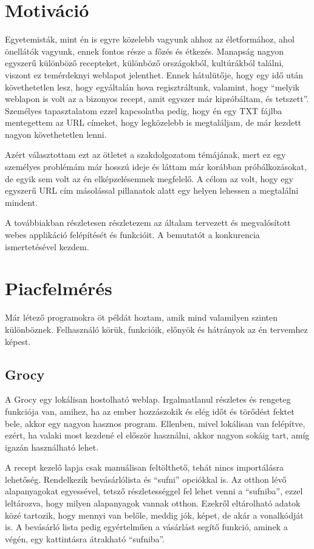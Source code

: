 \documentclass[12pt]{report}
\theoremstyle{definition}
\begin{document}
\chapter*{Motiváció}

Egyetemisták, mint én is egyre közelebb vagyunk ahhoz az életformához, ahol önellátók vagyunk, ennek fontos része a főzés és étkezés. Manapság nagyon egyszerű különböző recepteket, különböző országokból, kultúrákból találni, viszont ez temérdeknyi weblapot jelenthet. Ennek hátulütője, hogy egy idő után követhetetlen lesz, hogy egyáltalán hova regisztráltunk, valamint, hogy “melyik weblapon is volt az a bizonyos recept, amit egyszer már kipróbáltam, és tetszett”. Személyes tapasztalatom ezzel kapcsolatba pedig, hogy én egy TXT fájlba mentegettem az URL címeket, hogy legközelebb is megtaláljam, de már kezdett nagyon követhetetlen lenni.

Azért választottam ezt az ötletet a szakdolgozatom témájának, mert ez egy személyes problémám már hosszú ideje és láttam már korábban próbálkozásokat, de egyik sem volt az én elképzelésemnek megfelelő. A célom az volt, hogy egy egyszerű URL cím másolással pillanatok alatt egy helyen lehessen a megtalálni mindent.

A továbbiakban részletesen részletezem az általam tervezett és megvalósított webes applikáció felépítését és funkcióit. A bemutatót a konkurencia ismertetésével kezdem.


\chapter{Piacfelmérés}
Már létező programokra öt példát hoztam, amik mind valamilyen szinten különböznek.
Felhasználó körük, funkcióik, előnyök és hátrányok az én tervemhez képest.

\section{Grocy}
A Grocy egy lokálisan hostolható weblap. Irgalmatlanul részletes és rengeteg funkciója van, amihez, ha az ember hozzászokik és elég időt és törődést fektet bele, akkor egy nagyon hasznos program. Ellenben, mivel lokálisan van felépítve, ezért, ha valaki most kezdené el először használni, akkor nagyon sokáig tart, amíg igazán használható lehet.

A recept kezelő lapja csak manuálisan feltölthető, tehát nincs importálásra lehetőség. Rendelkezik bevásárlólista és “sufni” opciókkal is. Az otthon lévő alapanyagokat egyessével, tetsző részletességgel fel lehet venni a “sufniba”, ezzel leltározva, hogy milyen alapanyagok vannak otthon. Ezekről eltárolható adatok közé tartozik, hogy mennyi van belőle, meddig jók, képet, de akár a vonalkódját is. A bevásárló lista pedig egyértelműen a vásárlást segítő funkció, aminek a végén, egy kattintásra átrakható “sufniba”.
\end{document}
